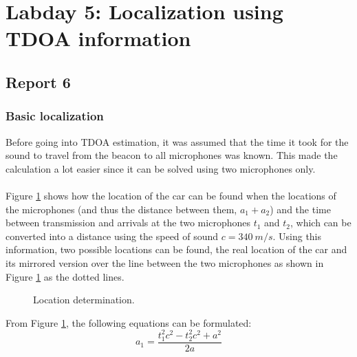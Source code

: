 \documentclass[final]{scrreprt} %
\begin{document}
\section*{Labday 5: Localization using TDOA information}
\subsection*{Report 6}
\subsubsection*{Basic localization}
Before going into TDOA estimation, it was assumed that the time it took for the sound to travel from the beacon to all microphones was known.
This made the calculation a lot easier since it can be solved using two microphones only.
\\ \\
Figure \ref{fig:location} shows how the location of the car can be found when the locations of the microphones (and thus the distance between them, $a_1 + a_2$) and the time between transmission and arrivals at the two microphones $t_1$ and $t_2$, which can be converted into a distance using the speed of sound $c = 340~m/s$.
Using this information, two possible locations can be found, the real location of the car and its mirrored version over the line between the two microphones as shown in Figure \ref{fig:location} as the dotted lines.

\begin{figure} [H]
\centering
	\caption{Location determination.}
	\label{fig:location}
\end{figure}

From Figure \ref{fig:location}, the following equations can be formulated:
\begin{equation}
	a_1 = \frac{t_1^2 c^2 - t_2^2 c^2 + a^2}{2 a}
\label{eq:a1}
\end{equation}
\end{document}
